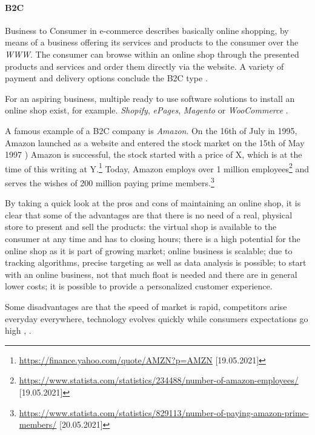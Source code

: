 \paragraph{B2C}
Business to Consumer in e-commerce describes basically online shopping, by means of a business offering its services and products to the consumer over the \textit{WWW}.
The consumer can browse within an online shop through the presented products and services and order them directly via the website.
A variety of payment and delivery options conclude the B2C type \cite{2020Heinemann}.

For an aspiring business, multiple ready to use software solutions to install an online shop exist, for example. \textit{Shopify}, \textit{ePages}, \textit{Magento} or \textit{WooCommerce} \cite{2019Steireif}.

A famous example of a B2C company is \textit{Amazon}.
On the 16th of July in 1995, Amazon launched as a website and entered the stock market on the 15th of May 1997 \cite{2019Stone}) %
Amazon is successful, the stock started with a price of X, which is at the time of this writing at Y.\footnote{\url{https://finance.yahoo.com/quote/AMZN?p=AMZN} [19.05.2021]} %
Today, Amazon employs over 1 million employees\footnote{\url{https://www.statista.com/statistics/234488/number-of-amazon-employees/} [19.05.2021]} and serves the wishes of 200 million paying prime members.\footnote{\url{https://www.statista.com/statistics/829113/number-of-paying-amazon-prime-members/} [20.05.2021]}


By taking a quick look at the pros and cons of maintaining an online shop, it is clear that some of the advantages are that there is no need of a real, physical store to present and sell the products: the virtual shop is available to the consumer at any time and has to closing hours; there is a high potential for the online shop as it is part of growing market; online business is scalable; due to tracking algorithms, precise targeting as well as data analysis is possible; to start with an online business, not that much float is needed and there are in general lower costs; it is possible to provide a personalized customer experience.

Some disadvantages are that the speed of market is rapid, competitors arise everyday everywhere, technology evolves quickly while consumers expectations go high \cite{2019Hermogeno}, \cite{2020Lang}.


